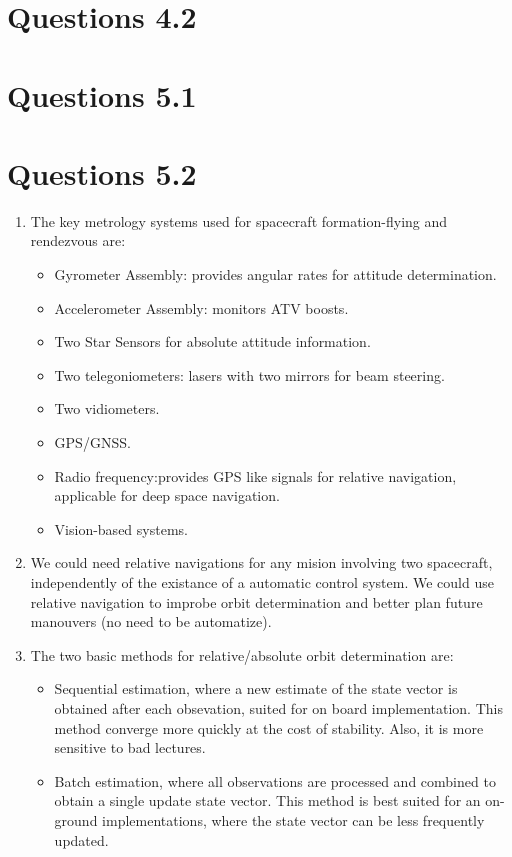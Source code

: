 \documentclass[a4paper]{article}
\begin{document}
\section{Questions 4.2}

\section{Questions 5.1}

\section{Questions 5.2}
\begin{enumerate}[label=\emph{\alph*)}]
  \item The key metrology systems used for spacecraft formation-flying and rendezvous are:
    \begin{itemize}
      \item Gyrometer Assembly: provides angular rates for attitude determination.
      \item Accelerometer Assembly: monitors ATV boosts.
      \item Two Star Sensors for absolute attitude information.
      \item Two telegoniometers: lasers with two mirrors for beam steering.
      \item Two vidiometers.
      \item GPS/GNSS.
      \item Radio frequency:provides GPS like signals for relative navigation, applicable for deep space navigation.
      \item Vision-based systems.
    \end{itemize}

  \item We could need relative navigations for any mision involving two spacecraft, independently of the existance of a automatic control system. We could use relative navigation to improbe orbit determination and better plan future manouvers (no need to be automatize).

  \item The two basic methods for relative/absolute orbit determination are:
    \begin{itemize}
      \item Sequential estimation, where a new estimate of the state vector is obtained after each obsevation, suited for on board implementation. This method converge more quickly at the cost of stability. Also, it is more sensitive to bad lectures.
      \item Batch estimation, where all observations are processed and combined to obtain a single update state vector. This method is best suited for an on-ground implementations, where the state vector can be less frequently updated.
    \end{itemize}
  

\end{enumerate}
\end{document}
